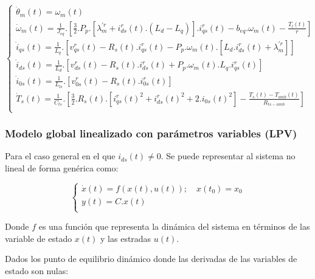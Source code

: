 \documentclass{article}
\begin{document}
\begin{equation}\label{eq.modelo_global}
    \begin{cases}
        \dot{\theta}_{m}(t) = \omega_{m}(t)\\
        \dot{\omega}_{m}(t) = \frac{1}{J_{eq}}.[\frac{3}{2}.P_{p}.[\lambda_{m}^{\prime r}+i_{ds}^r(t).(L_{d}-L_{q})].i_{qs}^r(t) - b_{eq}.\omega_{m}(t) - \frac{T_{l}(t)}{r}]\\
        \dot{i}_{qs}(t) = \frac{1}{L_{q}}.[v_{qs}^r(t) - R_{s}(t).i_{qs}^r(t) - P_{p}.\omega_{m}(t).[L_{d}.i_{ds}^r(t) + \lambda_{m}^{\prime r}]]  \\
        \dot{i}_{ds}(t) = \frac{1}{L_{d}}.[v_{ds}^r(t) - R_{s}(t).i_{ds}^r(t) + P_{p}.\omega_{m}(t).L_{q}.i_{qs}^r(t)]  \\
        \dot{i}_{0s}(t) = \frac{1}{L_{ls}}.[v_{0s}^r(t) - R_{s}(t).i_{0s}^r(t)]\\
        \dot{T}_{s}(t) = \frac{1}{C_{ts}}.[\frac{3}{2}.R_{s}(t).[{i_{qs}^r(t)}^2+{i_{ds}^r(t)}^2 + 2.i_{0s}(t)^2] - \frac{T_{s}(t)-T_{amb}(t)}{R_{ts-amb}}]\\
    \end{cases}
\end{equation}



\subsubsection{Modelo global linealizado con parámetros variables (LPV)}

Para el caso general en el que ${i}_{ds}(t) \neq 0$. Se puede representar al sistema no lineal de forma genérica
como: 

\begin{equation}
    \begin{cases}
        \dot{x}(t) = f(x(t),u(t));  \quad   x(t_{0}) = x_{0}\\
        y(t) = C.x(t)\\
    \end{cases}
\end{equation}

Donde $f$ es una función que representa la dinámica del sistema en términos de las variable 
de estado $x(t)$ y las estradas $u(t)$.  

Dados los punto de equilibrio dinámico donde las derivadas de las variables de estado son nulas:
\end{document}

